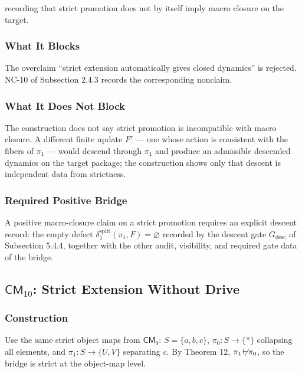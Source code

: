 \documentclass[11pt]{article}
\providecommand{\factor}{\mathrel{\!\vdash\!}}
\theoremstyle{definition}
\begin{document}
recording that strict promotion does not by itself imply macro closure on the target.

\subsubsection{What It Blocks}

The overclaim ``strict extension automatically gives closed dynamics'' is rejected. NC-10 of Subsection 2.4.3 records the corresponding nonclaim.

\subsubsection{What It Does Not Block}

The construction does not say strict promotion is incompatible with macro closure. A different finite update \(F'\) --- one whose action is consistent with the fibers of \(\pi_1\) --- would descend through \(\pi_1\) and produce an admissible descended dynamics on the target package; the construction shows only that descent is independent data from strictness.

\subsubsection{Required Positive Bridge}

A positive macro-closure claim on a strict promotion requires an explicit descent record: the empty defect \(\delta_1^{\mathrm{split}}(\pi_1,F)=\varnothing\) recorded by the descent gate \(G_{\mathrm{desc}}\) of Subsection 5.4.4, together with the other audit, visibility, and required gate data of the bridge.

\subsection{\texorpdfstring{\(\mathsf{CM}_{10}\): Strict Extension Without Drive}{C.11 \textbackslash mathsf\{CM\}\_\{10\}: Strict Extension Without Drive}}

\subsubsection{Construction}

Use the same strict object maps from \(\mathsf{CM}_9\): \(S=\{a,b,c\}\), \(\pi_0:S\to\{*\}\) collapsing all elements, and \(\pi_1:S\to\{U,V\}\) separating \(c\). By Theorem 12, \(\pi_1\not\factor\pi_0\), so the bridge is strict at the object-map level.
\end{document}
